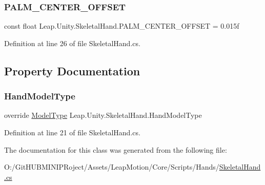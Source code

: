 \subsubsection{\texorpdfstring{PALM\_CENTER\_OFFSET}{PALM\_CENTER\_OFFSET}}
{\footnotesize\ttfamily const float Leap.\+Unity.\+Skeletal\+Hand.\+P\+A\+L\+M\+\_\+\+C\+E\+N\+T\+E\+R\+\_\+\+O\+F\+F\+S\+ET = 0.\+015f\hspace{0.3cm}{\ttfamily [protected]}}



Definition at line 26 of file Skeletal\+Hand.\+cs.



\subsection{Property Documentation}
\mbox{\label{class_leap_1_1_unity_1_1_skeletal_hand_a07d04ed397ffe907e83bc487ebaa226e}} 
\subsubsection{\texorpdfstring{HandModelType}{HandModelType}}
{\footnotesize\ttfamily override \mbox{\hyperlink{namespace_leap_1_1_unity_a186e5eb0a2b743f1f6b79346f0ab8ad0}{Model\+Type}} Leap.\+Unity.\+Skeletal\+Hand.\+Hand\+Model\+Type\hspace{0.3cm}{\ttfamily [get]}}



Definition at line 21 of file Skeletal\+Hand.\+cs.



The documentation for this class was generated from the following file\+:\begin{DoxyCompactItemize}
\item 
O\+:/\+Git\+H\+U\+B\+M\+I\+N\+I\+P\+Roject/\+Assets/\+Leap\+Motion/\+Core/\+Scripts/\+Hands/\mbox{\hyperlink{_skeletal_hand_8cs}{Skeletal\+Hand.\+cs}}\end{DoxyCompactItemize}
